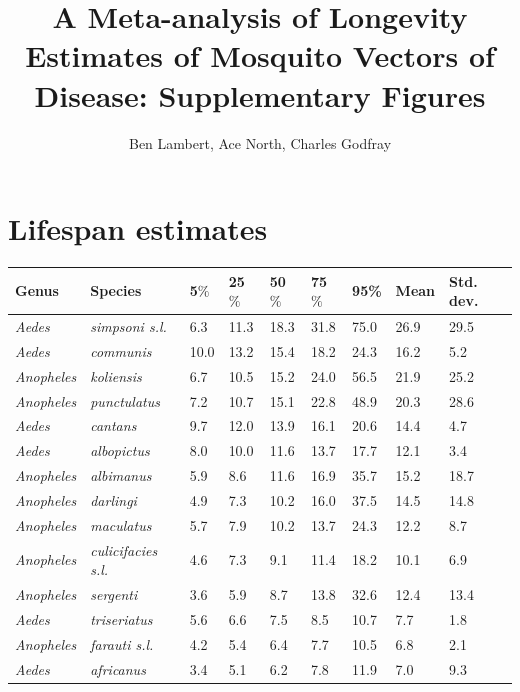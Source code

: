 \documentclass[12pt]{article}
\title{A Meta-analysis of Longevity Estimates of Mosquito Vectors of Disease: Supplementary Figures}
\author{Ben Lambert, Ace North, Charles Godfray}
\begin{document}
\maketitle

\section{Lifespan estimates}

\begin{table}[htbp]
	\begin{tabular}{l|l|l|l|l|l|l|l|l}
		\textbf{Genus} & \textbf{Species} & \textbf{5$\%$} & \textbf{25$\%$} & \textbf{50$\%$} & \textbf{75$\%$} & \textbf{95\%} &  \textbf{Mean} & \textbf{Std. dev.}\\
		\hline
		\textit{Aedes} & \textit{simpsoni s.l.} & 6.3 & 11.3 & 18.3 & 31.8 & 75.0 & 26.9 & 29.5 \\
		\textit{Aedes} & \textit{communis} & 10.0 & 13.2 & 15.4 & 18.2 & 24.3 & 16.2 & 5.2 \\
		\textit{Anopheles} & \textit{koliensis} & 6.7 & 10.5 & 15.2 & 24.0 & 56.5 & 21.9 & 25.2 \\
		\textit{Anopheles} & \textit{punctulatus} & 7.2 & 10.7 & 15.1 & 22.8 & 48.9 & 20.3 & 28.6 \\
		\textit{Aedes} & \textit{cantans} & 9.7 & 12.0 & 13.9 & 16.1 & 20.6 & 14.4 & 4.7 \\
		\textit{Aedes} & \textit{albopictus} & 8.0 & 10.0 & 11.6 & 13.7 & 17.7 & 12.1 & 3.4 \\
		\textit{Anopheles} & \textit{albimanus} & 5.9 & 8.6 & 11.6 & 16.9 & 35.7 & 15.2 & 18.7 \\
		\textit{Anopheles} & \textit{darlingi} & 4.9 & 7.3 & 10.2 & 16.0 & 37.5 & 14.5 & 14.8 \\
		\textit{Anopheles} & \textit{maculatus} & 5.7 & 7.9 & 10.2 & 13.7 & 24.3 & 12.2 & 8.7 \\
		\textit{Anopheles} & \textit{culicifacies s.l.} & 4.6 & 7.3 & 9.1 & 11.4 & 18.2 & 10.1 & 6.9 \\
		\textit{Anopheles} & \textit{sergenti} & 3.6 & 5.9 & 8.7 & 13.8 & 32.6 & 12.4 & 13.4 \\
		\textit{Aedes} & \textit{triseriatus} & 5.6 & 6.6 & 7.5 & 8.5 & 10.7 & 7.7 & 1.8 \\
		\textit{Anopheles} & \textit{farauti s.l.} & 4.2 & 5.4 & 6.4 & 7.7 & 10.5 & 6.8 & 2.1 \\
		\textit{Aedes} & \textit{africanus} & 3.4 & 5.1 & 6.2 & 7.8 & 11.9 & 7.0 & 9.3 \\

\end{tabular}
\end{table}
\end{document}
